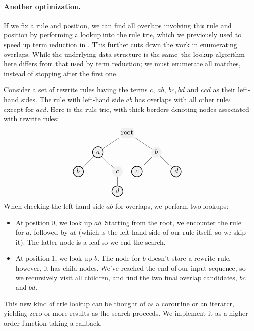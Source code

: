 \documentclass[../generics]{subfiles}
\begin{document}
\paragraph{Another optimization.} If we fix a rule and position, we can find all overlaps involving this rule and position by performing a lookup into the rule trie, which we previously used to speed up term reduction in . This further cuts down the work in enumerating overlaps. While the underlying data structure is the same, the lookup algorithm here differs from that used by term reduction; we must enumerate all matches, instead of stopping after the first one.

Consider a set of rewrite rules having the terms $a$, $ab$, $bc$, $bd$ and $acd$ as their left-hand sides. The rule with left-hand side $ab$ has overlaps with all other rules except for $acd$. Here is the rule trie, with thick borders denoting nodes associated  with rewrite rules:
\[
\begin{tikzpicture}
  [level distance=10mm,
   every node/.style={fill=light-gray!60,circle,inner sep=1pt},
   level 1/.style={sibling distance=30mm},
   level 2/.style={sibling distance=20mm},
   level 3/.style={sibling distance=10mm}]
  \node [rounded corners, rectangle] {\strut root}
     child {node [thick, draw=black] {$\strut a$}
       child {node [thick, draw=black] {$\strut b$}}
       child {node {$\strut c$}
         child {node [thick, draw=black] {$\strut d$}}
       }
     }
     child {node {$\strut b$}
       child {node [thick, draw=black] {$\strut c$}}
       child {node [thick, draw=black] {$\strut d$}}
     };
\end{tikzpicture}
\]
When checking the left-hand side $ab$ for overlaps, we perform two lookups:
\begin{itemize}
\item At position 0, we look up $ab$. Starting from the root, we encounter the rule for $a$, followed by $ab$ (which is the left-hand side of our rule itself, so we skip it). The latter node is a leaf so we end the search.
\item At position 1, we look up $b$. The node for $b$ doesn't store a rewrite rule, however, it has child nodes. We've reached the end of our input sequence, so we recursively visit all children, and find the two final overlap candidates, $bc$ and $bd$.
\end{itemize}
This new kind of trie lookup can be thought of as a coroutine or an iterator, yielding zero or more results as the search proceeds. We implement it as a higher-order function taking a callback.
\end{document}
